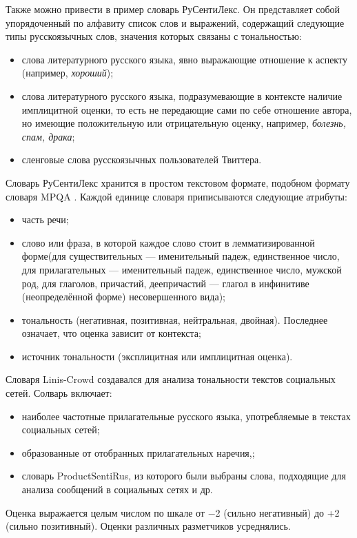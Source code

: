 Также можно привести в пример словарь РуСентиЛекс. Он представляет собой упорядоченный по алфавиту список слов и выражений, содержащий следующие типы русскоязычных слов, значения которых связаны с тональностью: 
\begin{itemize}
	\item слова литературного русского языка, явно выражающие отношение к аспекту (например, \textit{хороший});
	\item слова литературного русского языка, подразумевающие в контексте наличие имплицитной оценки, то есть не передающие сами по себе отношение автора, но имеющие положительную или отрицательную оценку, например, \textit{болезнь, спам, драка};
	\item сленговые слова русскоязычных пользователей Твиттера.
\end{itemize}
Словарь РуСентиЛекс хранится в простом текстовом формате, подобном формату словаря MPQA \cite{mpqa}. Каждой единице словаря приписываются следующие атрибуты:
\begin{itemize}
	\item часть речи;
	\item слово или фраза, в которой каждое слово стоит в лемматизированной форме(для существительных --- именительный падеж, единственное число, для прилагательных --- именительный падеж, единственное число, мужской род, для глаголов, причастий, деепричастий --- глагол в инфинитиве (неопределённой форме) несовершенного вида);
	\item тональность (негативная, позитивная, нейтральная, двойная). Последнее означает, что оценка зависит от контекста;
	\item источник тональности (эксплицитная или имплицитная оценка).
\end{itemize}
Словаря Linis-Crowd \cite{linsucrowd} создавался для анализа тональности текстов социальных сетей. Солварь включает:
\begin{itemize}
	\item наиболее частотные прилагательные русского языка, употребляемые в текстах социальных сетей;
	\item образованные от отобранных прилагательных наречия,;
	\item словарь ProductSentiRus, из которого были выбраны слова, подходящие для анализа сообщений в социальных сетях и др.
\end{itemize}
Оценка выражается целым числом по шкале от $-$2 (сильно негативный) до +2 (сильно позитивный). Оценки различных разметчиков усреднялись.
